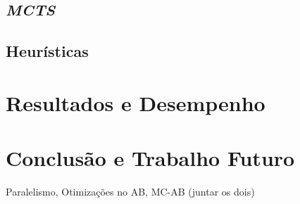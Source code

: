 \documentclass[12pt,a4paper,oneside]{article}
\begin{document}
\lipsum[2]

\subsection{\textit{MCTS}}

\lipsum[1]

\lipsum[2]

\lipsum[3]

\subsection{Heurísticas}

\lipsum[1]

\lipsum[2]

\lipsum[3]


\section{Resultados e Desempenho}
\label{sec:resdes}

\lipsum[1]

\lipsum[2]

\lipsum[3]


\section{Conclusão e Trabalho Futuro}
\label{sec:conc}

Paralelismo, Otimizações no AB, MC-AB (juntar os dois)\cite{Dutra:2015}

\lipsum[1]

\lipsum[2]



\end{document}
